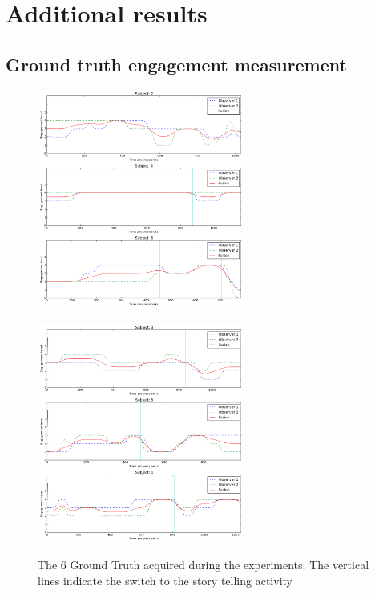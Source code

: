 \chapter{Additional results} \label{appendix}

\section{Ground truth engagement measurement} \label{ap:GT}

\begin{figure}[h!]
    \centering
    \includegraphics[width=0.6\textwidth]{figures/GT1.png}
    \label{fig:GT1}
\end{figure}
\newpage
\begin{figure}[h!]
    \centering
    \includegraphics[width=0.6\textwidth]{figures/GT2.png}
    \label{fig:GT2}
    \caption{The 6 Ground Truth acquired during the experiments. The vertical lines indicate the switch to the story telling activity}\label{fig:GTTotal}
\end{figure}

